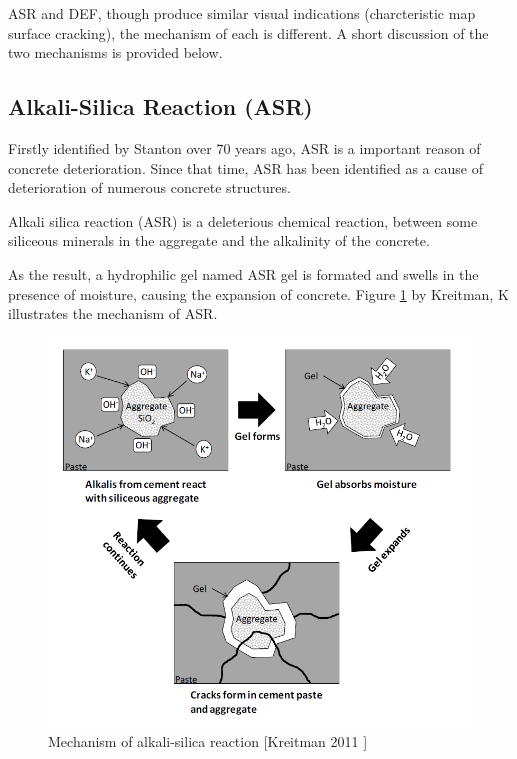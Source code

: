 
ASR and DEF, though produce similar visual indications (charcteristic map surface cracking), the mechanism of each is different. A short discussion of the two mechanisms is provided below.

\subsection{Alkali-Silica Reaction (ASR)}

Firstly identified by Stanton\cite{Stanton} over 70 years ago, ASR is a important reason of concrete deterioration. Since that time, ASR has been identified as a cause of deterioration of numerous concrete structures.


Alkali silica reaction (ASR) is a deleterious chemical reaction, between some siliceous minerals in the aggregate and the alkalinity of the concrete.

As the result, a hydrophilic gel named ASR gel is formated and swells in the presence of moisture, causing the expansion of concrete. Figure \ref{ASR_mechanism} by Kreitman, K\cite{Kreitman} illustrates the mechanism of ASR.


\begin{figure}[ht]
\centering
\includegraphics[width=.8\linewidth]{Reference/Kreitman.png}
  \caption{Mechanism of alkali-silica reaction [Kreitman 2011 \cite{Kreitman}]}
  \label{ASR_mechanism}
\end{figure}

